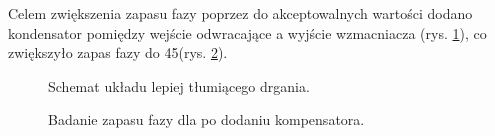 \documentclass[polish,engineer]{polsl-msth}
\begin{document}
Celem zwiększenia zapasu fazy poprzez do akceptowalnych wartości dodano kondensator pomiędzy wejście odwracające a wyjście wzmacniacza (rys. \ref{img:HereYouAreMrCap}), co zwiększyło zapas fazy do 45\degree (rys. \ref{img:MrBodeWithCap}).
\begin{figure}[hbtp]
    \centering
     \caption{Schemat układu lepiej tłumiącego drgania. \label{img:HereYouAreMrCap}}
\end{figure}
\begin{figure}[hbtp]
     \caption{Badanie zapasu fazy dla po dodaniu kompensatora. \label{img:MrBodeWithCap}}
\end{figure}
\end{document}
